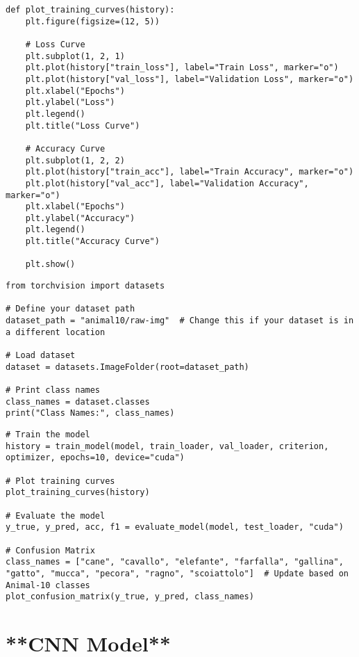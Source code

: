 \begin{verbatim}
def plot_training_curves(history):
    plt.figure(figsize=(12, 5))

    # Loss Curve
    plt.subplot(1, 2, 1)
    plt.plot(history["train_loss"], label="Train Loss", marker="o")
    plt.plot(history["val_loss"], label="Validation Loss", marker="o")
    plt.xlabel("Epochs")
    plt.ylabel("Loss")
    plt.legend()
    plt.title("Loss Curve")

    # Accuracy Curve
    plt.subplot(1, 2, 2)
    plt.plot(history["train_acc"], label="Train Accuracy", marker="o")
    plt.plot(history["val_acc"], label="Validation Accuracy", marker="o")
    plt.xlabel("Epochs")
    plt.ylabel("Accuracy")
    plt.legend()
    plt.title("Accuracy Curve")

    plt.show()

\end{verbatim}

\begin{verbatim}
from torchvision import datasets

# Define your dataset path
dataset_path = "animal10/raw-img"  # Change this if your dataset is in a different location

# Load dataset
dataset = datasets.ImageFolder(root=dataset_path)

# Print class names
class_names = dataset.classes
print("Class Names:", class_names)

\end{verbatim}

\begin{verbatim}
# Train the model
history = train_model(model, train_loader, val_loader, criterion, optimizer, epochs=10, device="cuda")

# Plot training curves
plot_training_curves(history)

# Evaluate the model
y_true, y_pred, acc, f1 = evaluate_model(model, test_loader, "cuda")

# Confusion Matrix
class_names = ["cane", "cavallo", "elefante", "farfalla", "gallina", "gatto", "mucca", "pecora", "ragno", "scoiattolo"]  # Update based on Animal-10 classes
plot_confusion_matrix(y_true, y_pred, class_names)

\end{verbatim}

\section{**CNN Model**}


